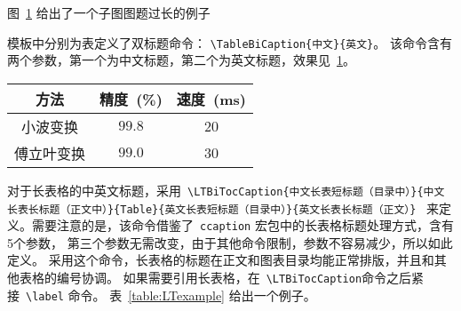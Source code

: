 图~\ref{Figure:Tricks:Example31} 给出了一个子图图题过长的例子
\begin{figure}[htbp]
\centering
\begin{minipage}[t]{0.20\textwidth}
\centering
{}
\end{minipage}\hspace{2em}
\begin{minipage}[t]{0.20\textwidth}
\centering
{}
\end{minipage}\hspace{2em}
\begin{minipage}[t]{0.20\textwidth}
\centering
{}
\end{minipage}
\label{Figure:Tricks:Example31}
\end{figure}


模板中分别为表定义了双标题命令：
\verb"\TableBiCaption{中文}{英文}"。
该命令含有两个参数，第一个为中文标题，第二个为英文标题，效果见~\ref{Tricks:Tab1}。


\begin{table}[htbp]
\centering 
{}
\label{Tricks:Tab1}
\begin{tabular}{c|c|c}
  \hline
  方法 & 精度~(\%) & 速度~(ms) \\
  \hline
  小波变换 & $99.8$ &  20\\
  傅立叶变换 & $99.0$ & 30 \\
  \hline
\end{tabular}
\end{table}

对于长表格的中英文标题，采用~\verb"\LTBiTocCaption{中文长表短标题（目录中）}{中文长表长标题（正文中）}{Table}{英文长表短标题（目录中）}{英文长表长标题（正文）}"
~来定义。需要注意的是，该命令借鉴了~\verb|ccaption| 宏包中的长表格标题处理方式，含有5个参数，
第三个参数无需改变，由于其他命令限制，参数不容易减少，所以如此定义。
采用这个命令，长表格的标题在正文和图表目录均能正常排版，并且和其他表格的编号协调。
如果需要引用长表格，在~\verb|\LTBiTocCaption|命令之后紧接~\verb|\label| 命令。
表~\ref{table:LTexample} 给出一个例子。

